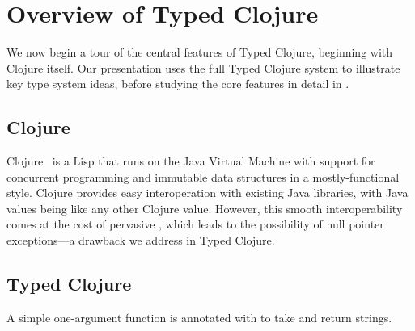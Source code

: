 \section{Overview of Typed Clojure}

\label{sec:overview}

We now begin a tour of the central features of Typed Clojure,
beginning with Clojure itself. Our presentation
uses the full Typed Clojure system to illustrate key type system
ideas, before studying the core features in detail in
. 

\subsection{Clojure}

Clojure~\cite{Hic08} is a Lisp that runs on the
Java Virtual Machine with support for concurrent programming
and immutable data structures in a mostly-functional
style.
%
Clojure provides easy interoperation with existing Java libraries, with Java values being like any other Clojure value. 
However, this smooth interoperability comes at the cost of pervasive , which leads to the possibility of null pointer exceptions---a drawback we address in Typed Clojure.

%
%
%

\subsection{Typed Clojure}

A simple one-argument function  is annotated with  to take and return strings.

